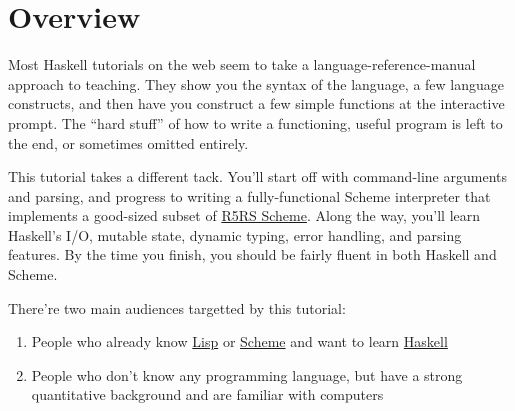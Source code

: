\chapter*{Overview}
 
 
Most Haskell tutorials on the web seem to take a language-reference-manual approach to teaching. They show you the syntax of the language, a few language constructs, and then have you construct a few simple functions at the interactive prompt. The ``hard stuff'' of how to write a functioning, useful program is left to the end, or sometimes omitted entirely.
 
This tutorial takes a different tack. You'll start off with command-line arguments and parsing, and progress to writing a fully-functional Scheme interpreter that implements a good-sized subset of \href{http://www.schemers.org/Documents/Standards/R5RS/HTML}{R5RS Scheme}. Along the way, you'll learn Haskell's I/O, mutable state, dynamic typing, error handling, and parsing features. By the time you finish, you should be fairly fluent in both Haskell and Scheme.
 
There're two main audiences targetted by this tutorial:
 
\begin{enumerate}
	\item People who already know \href{http://en.wikipedia.org/wiki/Lisp_programming_language}{Lisp} or \href{http://en.wikipedia.org/wiki/Scheme_programming_language}{Scheme} and want to learn \href{http://en.wikipedia.org/wiki/Haskell_programming_language}{Haskell}
	\item People who don't know any programming language, but have a strong quantitative background and are familiar with computers
\end{enumerate}
 
